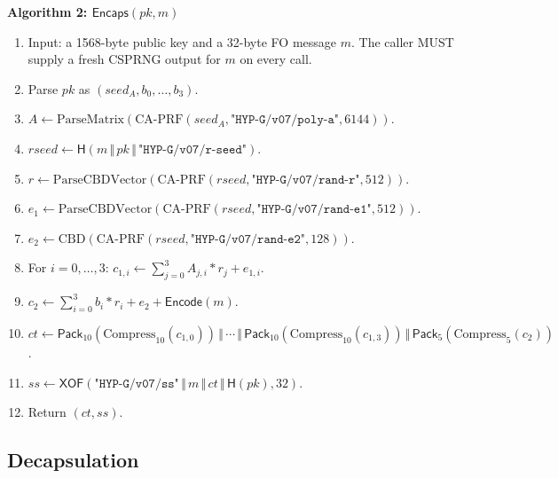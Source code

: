 \documentclass[11pt,a4paper]{article}
\theoremstyle{plain}
\theoremstyle{definition}
\theoremstyle{remark}
\newcommand{\concat}{\,\Vert\,}
\newcommand{\Hash}{\mathsf{H}}
\newcommand{\XOF}{\mathsf{XOF}}
\newcommand{\Encaps}{\mathsf{Encaps}}
\newcommand{\Encode}{\mathsf{Encode}}
\newcommand{\Pack}{\mathsf{Pack}}
\newcommand{\CBD}{\mathrm{CBD}}
\newcommand{\Compress}{\mathrm{Compress}}
\newenvironment{steps}[1]
  {\par\medskip\noindent\textbf{#1}\par\nopagebreak\small
   \begin{enumerate}[label=\arabic*:,leftmargin=*]}
  {\end{enumerate}\par\medskip}
\begin{document}
\begin{steps}{Algorithm 2: $\Encaps(pk,m)$}
\item Input: a 1568-byte public key and a 32-byte FO message $m$.
  The caller MUST supply a fresh CSPRNG output for $m$ on every call.
\item Parse $pk$ as $(\mathit{seed}_A,b_0,\ldots,b_3)$.
\item $A\gets\mathrm{ParseMatrix}(
  \mathrm{CA\text{-}PRF}(\mathit{seed}_A,
  \texttt{"HYP-G/v07/poly-a"},6144))$.
\item $\mathit{rseed}\gets
  \Hash(m\concat pk\concat\texttt{"HYP-G/v07/r-seed"})$.
\item $r\gets\mathrm{ParseCBDVector}(
  \mathrm{CA\text{-}PRF}(\mathit{rseed},
  \texttt{"HYP-G/v07/rand-r"},512))$.
\item $e_1\gets\mathrm{ParseCBDVector}(
  \mathrm{CA\text{-}PRF}(\mathit{rseed},
  \texttt{"HYP-G/v07/rand-e1"},512))$.
\item $e_2\gets\CBD(\mathrm{CA\text{-}PRF}(\mathit{rseed},
  \texttt{"HYP-G/v07/rand-e2"},128))$.
\item For $i=0,\ldots,3$: $c_{1,i}\gets
  \sum_{j=0}^{3}A_{j,i}*r_j+e_{1,i}$.
\item $c_2\gets\sum_{i=0}^{3}b_i*r_i+e_2+\Encode(m)$.
\item $ct\gets\Pack_{10}(\Compress_{10}(c_{1,0}))\concat\cdots
  \concat\Pack_{10}(\Compress_{10}(c_{1,3}))
  \concat\Pack_5(\Compress_5(c_2))$.
\item $ss\gets\XOF(\texttt{"HYP-G/v07/ss"}\concat m\concat ct
  \concat\Hash(pk),32)$.
\item Return $(ct,ss)$.
\end{steps}

\subsection{Decapsulation}
\end{document}
